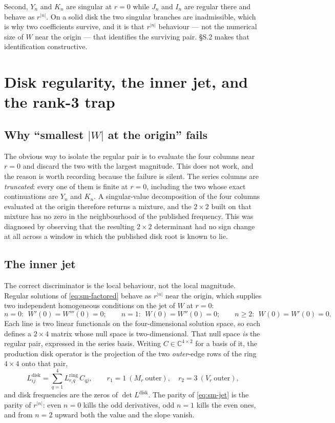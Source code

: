 \documentclass[11pt]{article}
\begin{document}
Second, $Y_n$ and $K_n$ are singular at $r=0$ while $J_n$ and $I_n$ are
regular there and behave as $r^{|n|}$. On a solid disk the two singular
branches are inadmissible, which is why two coefficients survive, and it is
that $r^{|n|}$ behaviour --- not the numerical size of $W$ near the origin ---
that identifies the surviving pair. \S{}S.2 makes that identification
constructive.

\section{Disk regularity, the inner jet, and the rank-3 trap}\label{sec:sm-disk}

\subsection{Why ``smallest \texorpdfstring{$|W|$}{|W|} at the origin'' fails}\label{sec:sm-naive}
The obvious way to isolate the regular pair is to evaluate the four columns
near $r=0$ and discard the two with the largest magnitude. This does not work,
and the reason is worth recording because the failure is silent. The series
columns are \emph{truncated}: every one of them is finite at $r=0$, including
the two whose exact continuations are $Y_n$ and $K_n$. A singular-value
decomposition of the four columns evaluated at the origin therefore returns a
mixture, and the $2\times2$ built on that mixture has no zero in the
neighbourhood of the published frequency. This was diagnosed by observing that
the resulting $2\times2$ determinant had no sign change at all across a window
in which the published disk root is known to lie.

\subsection{The inner jet}\label{sec:sm-jet}
The correct discriminator is the local behaviour, not the local magnitude.
Regular solutions of \eqref{eq:sm-factored} behave as $r^{|n|}$ near the
origin, which supplies two independent homogeneous conditions on the jet of
$W$ at $r=0$:
\begin{equation}
n=0:\ \ W'(0)=W'''(0)=0;\qquad
n=1:\ \ W(0)=W''(0)=0;\qquad
n\ge2:\ \ W(0)=W'(0)=0.
\label{eq:sm-jet}
\end{equation}
Each line is two linear functionals on the four-dimensional solution space,
so each defines a $2\times4$ matrix whose null space is two-dimensional. That
null space \emph{is} the regular pair, expressed in the series basis. Writing
$C\in\mathbb{C}^{4\times2}$ for a basis of it, the production disk operator is
the projection of the two \emph{outer}-edge rows of the ring $4\times4$ onto
that pair,
\begin{equation}
L^{\mathrm{disk}}_{ij}=\sum_{q=1}^{4}L^{\mathrm{ring}}_{r_i q}\,C_{qj},
\qquad r_1=1\ (M_r\ \text{outer}),\quad r_2=3\ (V_r\ \text{outer}),
\label{eq:sm-proj}
\end{equation}
and disk frequencies are the zeros of $\det L^{\mathrm{disk}}$. The parity of
\eqref{eq:sm-jet} is the parity of $r^{|n|}$: even $n=0$ kills the odd
derivatives, odd $n=1$ kills the even ones, and from $n=2$ upward both the
value and the slope vanish.
\end{document}
